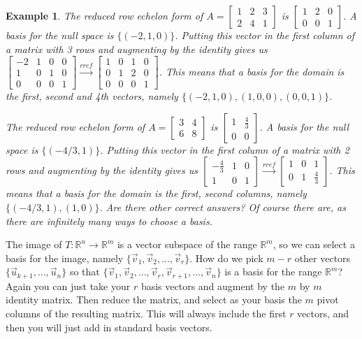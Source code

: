 \documentclass[10pt]{article}
\theoremstyle{plain}
\theoremstyle{box}
\newtheorem{example}{Example}
\begin{document}
\begin{example}
The reduced row echelon form of 
$A=
\begin{bmatrix}
 1 & 2 & 3 \\
 2 & 4 & 1
\end{bmatrix}
$
is
$
\begin{bmatrix}
 1 & 2 & 0 \\
 0 & 0 & 1
\end{bmatrix}
$.  A basis for the null space is $\{(-2,1,0)\}$. Putting this vector in the first column of a matrix with 3 rows and augmenting by the identity gives us 
$
\begin{bmatrix}
 -2 & 1 & 0 & 0 \\
 1 & 0 & 1 & 0 \\
 0 & 0 & 0 & 1\end{bmatrix}
\xrightarrow{rref}
\begin{bmatrix}
 1 & 0 & 1 & 0 \\
 0 & 1 & 2 & 0 \\
 0 & 0 & 0 & 1
\end{bmatrix}
$.
This means that a basis for the domain is the first, second and 4th vectors, namely $\{(-2,1,0),(1,0,0), (0,0,1)\}$. 


The reduced row echelon form of 
$A=
\begin{bmatrix}
 3 & 4 \\
 6 & 8
\end{bmatrix}
$
is
$
\begin{bmatrix}
 1 & \frac{4}{3} \\
 0 & 0
\end{bmatrix}
$.  A basis for the null space is $\{(-4/3,1)\}$. Putting this vector in the first column of a matrix with 2 rows and augmenting by the identity gives us 
$
\begin{bmatrix}
 -\frac{4}{3} & 1 & 0 \\
 1 & 0 & 1
\end{bmatrix}
\xrightarrow{rref}
\begin{bmatrix}
 1 & 0 & 1 \\
 0 & 1 & \frac{4}{3}
\end{bmatrix}
$.
This means that a basis for the domain is the first, second columns, namely $\{(-4/3,1),(1,0)\}$. Are there other correct answers? Of course there are, as there are infinitely many ways to choose a basis.



\end{example}

The image of $T:{\mathbb{R}}^n\to{\mathbb{R}}^m$ is a vector subspace of the range ${\mathbb{R}}^m$, so we can select a basis for the image, namely $\{\vec v_1, \vec v_2,\ldots, \vec v_r\}$. How do we pick $m-r$ other vectors $\{\vec u_{k+1},\ldots, \vec u_n\}$ so that $\{\vec v_1, \vec v_2,\ldots, \vec v_r,\vec v_{r+1},\ldots, \vec v_n\}$ is a basis for the range ${\mathbb{R}}^m$? Again you can just take your $r$ basis vectors and augment by the $m$ by $m$ identity matrix.  Then reduce the matrix, and select as your basis the $m$ pivot columns of the resulting matrix.  This will always include the first $r$ vectors, and then you will just add in standard basis vectors.
\end{document}
